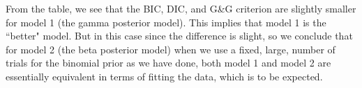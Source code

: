 \documentclass[a4paper, 9pt]{article}
\begin{document}
From the table, we see that the BIC, DIC, and G\&G criterion are slightly smaller for model 1 (the gamma posterior model). This implies that model 1 is the ``better" model. But in this case since the difference is slight, so we conclude that for model 2 (the beta posterior model) when we use a fixed, large, number of trials for the binomial prior as we have done, both model 1 and model 2 are essentially equivalent in terms of fitting the data, which is to be expected.
\end{document}
